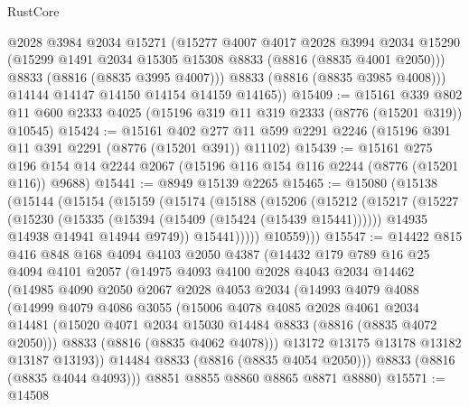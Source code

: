 \begin{lexlean}{RustCore}
\begin{coremodule}
          @2028
          @3984
          @2034
          @15271
          (@15277
            @4007
            @4017
            @2028
            @3994
            @2034
            @15290
            (@15299 @1491 @2034 @15305 @15308 @8833 (@8816 (@8835 @4001 @2050)))
            @8833
            (@8816 (@8835 @3995 @4007)))
          @8833
          (@8816 (@8835 @3985 @4008)))
        @14144
        @14147
        @14150
        @14154
        @14159
        @14165))
@15409 := @15161
    @339
    @802
    @11
    @600
    @2333
    @4025
    (@15196 @319 @11 @319 @2333 (@8776 (@15201 @319)) @10545)
@15424 := @15161
    @402
    @277
    @11
    @599
    @2291
    @2246
    (@15196 @391 @11 @391 @2291 (@8776 (@15201 @391)) @11102)
@15439 := @15161
    @275
    @196
    @154
    @14
    @2244
    @2067
    (@15196 @116 @154 @116 @2244 (@8776 (@15201 @116)) @9688)
@15441 := @8949 @15139 @2265
@15465 := @15080
    (@15138
      (@15144
        (@15154
          (@15159
            (@15174
              (@15188
                (@15206
                  (@15212
                    (@15217
                      (@15227
                        (@15230 (@15335 (@15394 (@15409 (@15424 (@15439 @15441))))))
                        @14935
                        @14938
                        @14941
                        @14944
                        @9749))
                    @15441)))))
          @10559)))
@15547 := @14422
    @815
    @416
    @848
    @168
    @4094
    @4103
    @2050
    @4387
    (@14432
      @179
      @789
      @16
      @25
      @4094
      @4101
      @2057
      (@14975
        @4093
        @4100
        @2028
        @4043
        @2034
        @14462
        (@14985
          @4090
          @2050
          @2067
          @2028
          @4053
          @2034
          (@14993
            @4079
            @4088
            (@14999
              @4079
              @4086
              @3055
              (@15006
                @4078
                @4085
                @2028
                @4061
                @2034
                @14481
                (@15020 @4071 @2034 @15030 @14484 @8833 (@8816 (@8835 @4072 @2050)))
                @8833
                (@8816 (@8835 @4062 @4078)))
              @13172
              @13175
              @13178
              @13182
              @13187
              @13193))
          @14484
          @8833
          (@8816 (@8835 @4054 @2050)))
        @8833
        (@8816 (@8835 @4044 @4093)))
      @8851
      @8855
      @8860
      @8865
      @8871
      @8880)
@15571 := @14508

\end{coremodule}
\end{lexlean}
